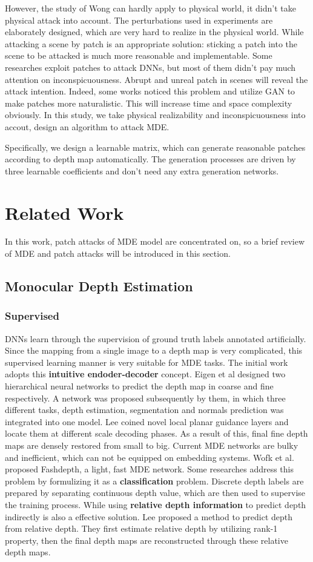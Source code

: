 \documentclass[10pt,twocolumn,letterpaper]{article}
\begin{document}
However, the study of Wong can hardly apply to physical 
world, it didn't take physical attack into account. 
The perturbations used in experiments are elaborately designed, 
which are very hard to realize in the physical world. 
While attacking a scene by patch is an appropriate solution: 
sticking a patch into the scene to be attacked is much more 
reasonable and implementable.
Some researches exploit patches to attack DNNs, but most of them 
didn't pay much attention on inconspicuousness. 
Abrupt and unreal patch in scenes will reveal the attack 
intention.
Indeed, some works noticed this problem and utilize GAN to make patches
more naturalistic. 
This will increase time and space complexity obviously.
In this study, we take physical realizability and 
inconspicuousness into accout, design an algorithm to attack MDE.

Specifically, we design a learnable matrix, 
which can generate reasonable patches according to depth map 
automatically. The generation processes are driven by three 
learnable coefficients and don't need any extra generation networks.

\section{Related Work}
In this work, patch attacks of MDE model are concentrated on, 
so a brief review of MDE and patch attacks will be 
introduced in this section.

\subsection{Monocular Depth Estimation}
\subsubsection{Supervised}
DNNs learn through the supervision of ground truth labels 
annotated artificially. Since the mapping from a single image 
to a depth map is very complicated, this supervised learning 
manner is very suitable for MDE tasks. The initial work adopts 
this \textbf{intuitive endoder-decoder} concept. 
Eigen et al designed two hierarchical neural networks to predict 
the depth map in coarse and fine respectively.
A network was proposed subsequently by them, in which three 
different tasks, depth estimation, segmentation and 
normals prediction was integrated into one model.
Lee coined novel local planar guidance layers and locate 
them at different scale decoding phases. 
As a result of this, final fine depth maps are densely 
restored from small to big.
Current MDE networks are bulky and inefficient, which can not
be equipped on embedding systems. Wofk et al. proposed Fashdepth,
a light, fast MDE network.
Some researches address this problem by formulizing it as 
a \textbf{classification} problem. 
Discrete depth labels are prepared by separating 
continuous depth value, which are then used to supervise 
the training process.
While using \textbf{relative depth information} to predict depth 
indirectly is also a effective solution.
Lee proposed a method to predict depth from relative depth. 
They first estimate relative depth by utilizing rank-1 property, 
then the final depth maps are reconstructed through these relative 
depth maps.
\end{document}
